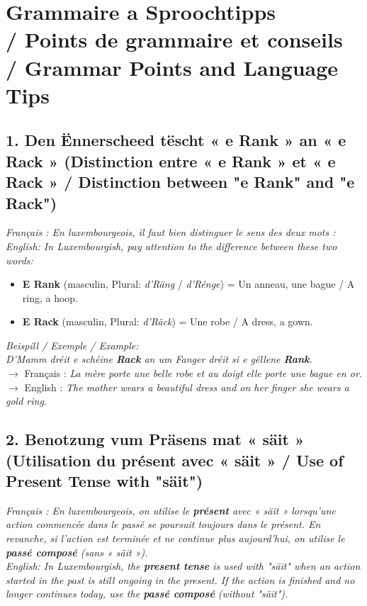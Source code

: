 \vspace{1.5em}

\section[Grammaire a Sproochtipps / Grammar \& Tips]{Grammaire a Sproochtipps \\/ Points de grammaire et conseils \\/ Grammar Points and Language Tips}

\subsection*{1. Den Ënnerscheed tëscht « e Rank » an « e Rack » (Distinction entre « e Rank » et « e Rack » / Distinction between "e Rank" and "e Rack")}

\noindent\textit{Français : En luxembourgeois, il faut bien distinguer le sens des deux mots :}\\
\textit{English: In Luxembourgish, pay attention to the difference between these two words:}
\begin{itemize}
    \item \textbf{E Rank} (masculin, Plural: \textit{d'Räng} / \textit{d'Rénge}) = Un anneau, une bague / A ring, a hoop.
    \item \textbf{E Rack} (masculin, Plural: \textit{d'Räck}) = Une robe / A dress, a gown.
\end{itemize}
\textit{Beispill / Exemple / Example:}\\
\textit{D'Mamm dréit e schéine \textbf{Rack} an um Fanger dréit si e gëllene \textbf{Rank}.}\\
$\rightarrow$ Français : \textit{La mère porte une belle robe et au doigt elle porte une bague en or.}\\
$\rightarrow$ English : \textit{The mother wears a beautiful dress and on her finger she wears a gold ring.}

\subsection*{2. Benotzung vum Präsens mat « säit » (Utilisation du présent avec « säit » / Use of Present Tense with "säit")}

\noindent\textit{Français : En luxembourgeois, on utilise le \textbf{présent} avec « säit » lorsqu'une action commencée dans le passé se poursuit toujours dans le présent. En revanche, si l'action est terminée et ne continue plus aujourd'hui, on utilise le \textbf{passé composé} (sans « säit »).}\\
\textit{English: In Luxembourgish, the \textbf{present tense} is used with "säit" when an action started in the past is still ongoing in the present. If the action is finished and no longer continues today, use the \textbf{passé composé} (without "säit").}

